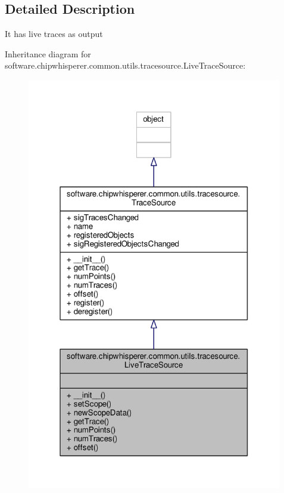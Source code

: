 \subsection{Detailed Description}
\begin{DoxyVerb}It has live traces as output \end{DoxyVerb}
 

Inheritance diagram for software.\+chipwhisperer.\+common.\+utils.\+tracesource.\+Live\+Trace\+Source\+:\nopagebreak
\begin{figure}[H]
\begin{center}
\leavevmode
\includegraphics[width=316pt]{d1/d6a/classsoftware_1_1chipwhisperer_1_1common_1_1utils_1_1tracesource_1_1LiveTraceSource__inherit__graph}
\end{center}
\end{figure}


